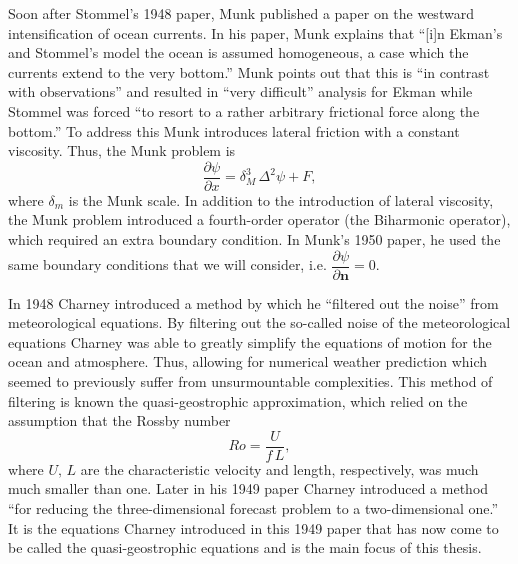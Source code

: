 Soon after Stommel's 1948 paper, Munk\cite{Munk1950} published a paper on the
westward intensification of ocean currents. In his paper, Munk explains that
``[i]n Ekman's and Stommel's model the ocean is assumed homogeneous, a case
which the currents extend to the very bottom.'' Munk points out that this is
``in contrast with observations'' and resulted in ``very difficult'' analysis
for Ekman while Stommel was forced ``to resort to a rather arbitrary frictional
force along the bottom.'' To address this Munk introduces lateral friction with
a constant viscosity. Thus, the Munk problem is
\cite{Fox-Kemper2003,Munk1950,Vallis06}
\begin{equation}
  \frac{\partial \psi}{\partial x} = \delta_M^3\, \Delta^2 \psi + F,
  \label{eqn:MunkProblem}
\end{equation}
where $\delta_m$ is the Munk scale. In addition to the introduction of lateral
viscosity, the Munk problem introduced a fourth-order operator (the Biharmonic
operator), which required an extra boundary condition.  In Munk's 1950
paper\cite{Munk1950}, he used the same boundary conditions that we will
consider, i.e. $\dfrac{\partial \psi}{\partial \mathbf{n}} = 0$.

In 1948 Charney\cite{Charney1948} introduced a method by which he ``filtered out
the noise'' from meteorological equations. By filtering out the so-called noise
of the meteorological equations Charney was able to greatly simplify the
equations of motion for the ocean and atmosphere. Thus, allowing for numerical
weather prediction which seemed to previously suffer from unsurmountable
complexities. This method of filtering is known  the quasi-geostrophic
approximation, which relied on the assumption that the Rossby number
\begin{equation}
  Ro = \frac{U}{f\, L},
  \label{eqn:RossbyNumber}
\end{equation}
where $U,\, L$ are the characteristic velocity and length, respectively, was
much much smaller than one. Later in his 1949 paper \cite{Charney1949} Charney
introduced a method ``for reducing the three-dimensional forecast problem to a
two-dimensional one.'' It is the equations Charney introduced in this 1949 paper
that has now come to be called the quasi-geostrophic equations and is the main
focus of this thesis.
